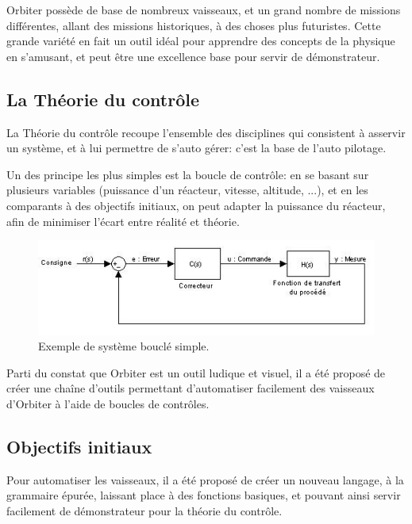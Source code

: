 \documentclass[a4paper,11pt]{article}
\begin{document}
        Orbiter possède de base de nombreux vaisseaux, et un grand nombre de missions différentes, allant des missions historiques, à des choses plus futuristes. Cette grande variété en fait un outil idéal pour apprendre des concepts de la physique en s'amusant, et peut être une excellence base pour servir de démonstrateur.

    \subsection{La Théorie du contrôle}
        La Théorie du contrôle recoupe l'ensemble des disciplines qui consistent à asservir un système, et à lui permettre de s'auto gérer: c'est la base de l’auto pilotage.

        Un des principe les plus simples est la boucle de contrôle: en se basant sur plusieurs variables (puissance d'un réacteur, vitesse, altitude, ...), et en les comparants à des objectifs initiaux, on peut adapter la puissance du réacteur, afin de minimiser l'écart entre réalité et théorie.

        \begin{figure}[!h]
            \begin{center}
                \includegraphics[width=1\textwidth]{img/boucle_controle.jpg}
                \caption{Exemple de système bouclé simple.}
            \end{center}
        \end{figure}

        Parti du constat que Orbiter est un outil ludique et visuel, il a été proposé de créer une chaîne d'outils permettant d'automatiser facilement des vaisseaux d'Orbiter à l'aide de boucles de contrôles.

    \subsection{Objectifs initiaux}
        Pour automatiser les vaisseaux, il a été proposé de créer un nouveau langage, à la grammaire épurée, laissant place à des fonctions basiques, et pouvant ainsi servir facilement de démonstrateur pour la théorie du contrôle.
\end{document}
